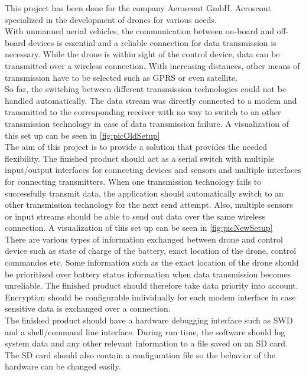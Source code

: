 %
\label{sec:txtAufgabenstellung}
This project has been done for the company Aeroscout GmbH. Aeroscout specialized in the development of drones for various needs. \\
With unmanned aerial vehicles, the communication between on-board and off-board devices is essential and a reliable connection for data transmission is necessary. While the drone is within sight of the control device, data can be transmitted over a wireless connection. With increasing distances, other means of transmission have to be selected such as GPRS or even satellite.\\
So far, the switching between different transmission technologies could not be handled automatically. The data stream was directly connected to a modem and transmitted to the corresponding receiver with no way to switch to an other transmission technology in case of data transmission failure. A visualization of this set up can be seen in \autoref{fig:picOldSetup}\\
%
The aim of this project is to provide a solution that provides the needed flexibility. The finished product should act as a serial switch with multiple input/output interfaces for connecting devices and sensors and multiple interfaces for connecting transmitters. When one transmission technology fails to successfully transmit data, the application should automatically switch to an other transmission technology for the next send attempt. Also, multiple sensors or input streams should be able to send out data over the same wireless connection. A visualization of this set up can be seen in \autoref{fig:picNewSetup}\\
%
There are various types of information exchanged between drone and control device such as state of charge of the battery, exact location of the drone, control commandos etc. Some information such as the exact location of the drone should be prioritized over battery status information when data transmission becomes unreliable. The finished product should therefore take data priority into account. \\
Encryption should be configurable individually for each modem interface in case sensitive data is exchanged over a connection. \\
The finished product should have a hardware debugging interface such as SWD and a shell/command line interface. During run time, the software should log system data and any other relevant information to a file saved on an SD card. The SD card should also contain a configuration file so the behavior of the hardware can be changed easily. \\
